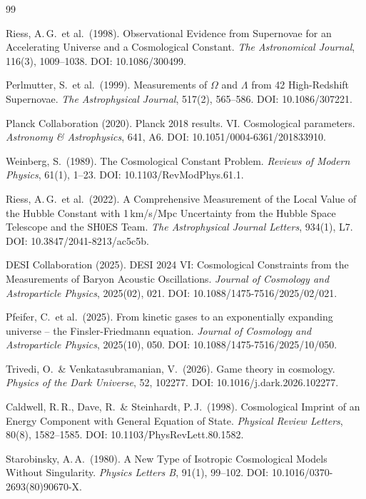 \documentclass[aps,prd,twocolumn,superscriptaddress,nofootinbib]{revtex4-2}
\begin{document}
\begin{thebibliography}{99}

Riess, A.\,G.\ et al.\ (1998).
Observational Evidence from Supernovae for an Accelerating Universe and a Cosmological Constant.
\textit{The Astronomical Journal}, 116(3), 1009--1038.
DOI: 10.1086/300499.

Perlmutter, S.\ et al.\ (1999).
Measurements of $\Omega$ and $\Lambda$ from 42 High-Redshift Supernovae.
\textit{The Astrophysical Journal}, 517(2), 565--586.
DOI: 10.1086/307221.

Planck Collaboration (2020).
Planck 2018 results. VI. Cosmological parameters.
\textit{Astronomy \& Astrophysics}, 641, A6.
DOI: 10.1051/0004-6361/201833910.

Weinberg, S.\ (1989).
The Cosmological Constant Problem.
\textit{Reviews of Modern Physics}, 61(1), 1--23.
DOI: 10.1103/RevModPhys.61.1.

Riess, A.\,G.\ et al.\ (2022).
A Comprehensive Measurement of the Local Value of the Hubble Constant with 1\,km/s/Mpc Uncertainty from the Hubble Space Telescope and the SH0ES Team.
\textit{The Astrophysical Journal Letters}, 934(1), L7.
DOI: 10.3847/2041-8213/ac5c5b.

DESI Collaboration (2025).
DESI 2024 VI: Cosmological Constraints from the Measurements of Baryon Acoustic Oscillations.
\textit{Journal of Cosmology and Astroparticle Physics}, 2025(02), 021.
DOI: 10.1088/1475-7516/2025/02/021.

Pfeifer, C.\ et al.\ (2025).
From kinetic gases to an exponentially expanding universe -- the Finsler-Friedmann equation.
\textit{Journal of Cosmology and Astroparticle Physics}, 2025(10), 050.
DOI: 10.1088/1475-7516/2025/10/050.

Trivedi, O.\ \& Venkatasubramanian, V.\ (2026).
Game theory in cosmology.
\textit{Physics of the Dark Universe}, 52, 102277.
DOI: 10.1016/j.dark.2026.102277.

Caldwell, R.\,R., Dave, R.\ \& Steinhardt, P.\,J.\ (1998).
Cosmological Imprint of an Energy Component with General Equation of State.
\textit{Physical Review Letters}, 80(8), 1582--1585.
DOI: 10.1103/PhysRevLett.80.1582.

Starobinsky, A.\,A.\ (1980).
A New Type of Isotropic Cosmological Models Without Singularity.
\textit{Physics Letters B}, 91(1), 99--102.
DOI: 10.1016/0370-2693(80)90670-X.


\end{thebibliography}
\end{document}
